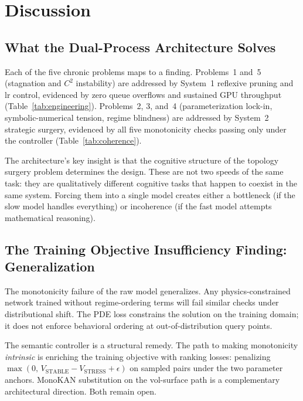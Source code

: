 \documentclass[11pt,a4paper]{article}
\begin{document}
\section{Discussion}
\label{sec:discussion}

\subsection{What the Dual-Process Architecture Solves}
\label{sec:discussion:solves}

Each of the five chronic problems maps to a finding. Problems~1 and~5 (stagnation
and $C^2$ instability) are addressed by System~1 reflexive pruning and lr control,
evidenced by zero queue overflows and sustained GPU throughput (Table~\ref{tab:engineering}).
Problems~2, 3, and~4 (parameterization lock-in, symbolic-numerical tension, regime
blindness) are addressed by System~2 strategic surgery, evidenced by all five
monotonicity checks passing only under the controller (Table~\ref{tab:coherence}).

The architecture's key insight is that the cognitive structure of the topology surgery
problem determines the design. These are not two speeds of the same task: they are
qualitatively different cognitive tasks that happen to coexist in the same system.
Forcing them into a single model creates either a bottleneck (if the slow model
handles everything) or incoherence (if the fast model attempts mathematical reasoning).

\subsection{The Training Objective Insufficiency Finding: Generalization}
\label{sec:discussion:generalization}

The monotonicity failure of the raw model generalizes. Any physics-constrained network
trained without regime-ordering terms will fail similar checks under distributional
shift. The PDE loss constrains the solution on the training domain; it does not
enforce behavioral ordering at out-of-distribution query points.

The semantic controller is a structural remedy. The path to making monotonicity
\emph{intrinsic} is enriching the training objective with ranking losses: penalizing
$\max(0,\, V_\text{STABLE} - V_\text{STRESS} + \epsilon)$ on sampled pairs under
the two parameter anchors. MonoKAN \citep{polo_molina_etal_2024_monokan} substitution
on the vol-surface path is a complementary architectural direction. Both remain open.
\end{document}
